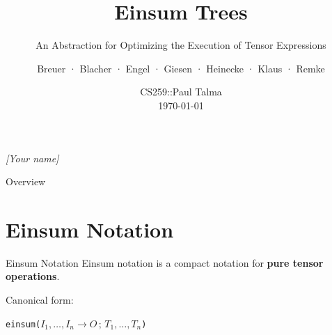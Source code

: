 \documentclass[aspectratio=169,10pt]{beamer}
\title{Einsum Trees}
\subtitle{An Abstraction for Optimizing the Execution of Tensor Expressions}
\author{Breuer · Blacher · Engel · Giesen · Heinecke · Klaus · Remke\\}
\date{CS259::Paul Talma\\\today}
\newcommand{\ein}[1]{{\small\texttt{#1}}}
\begin{document}
\begin{frame}
\maketitle
\textit{[Your name] }
\end{frame}

\begin{frame}{Overview}
\tableofcontents
\end{frame}

\section{Einsum Notation}

\begin{frame}{Einsum Notation}
	Einsum notation is a compact notation for \textbf{pure tensor operations}.

	Canonical form:
\begin{center}
\ein{einsum($I_1, \ldots, I_n \to O\,;\, T_1, \ldots, T_n$)}	
\end{center}	
	
	
\end{frame}
\end{document}
